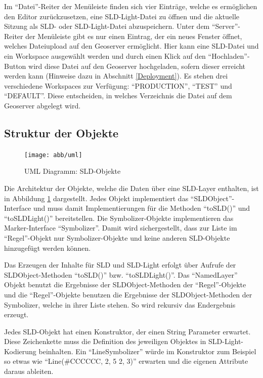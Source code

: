 Im \enquote{Datei}-Reiter der Menüleiste finden sich vier Einträge, welche es ermöglichen den Editor zurückzusetzen, eine SLD-Light-Datei zu öffnen und die aktuelle Sitzung als SLD- oder SLD-Light-Datei abzuspeichern. Unter dem \enquote{Server}-Reiter der Menüleiste gibt es nur einen Eintrag, der ein neues Fenster öffnet, welches Dateiupload auf den Geoserver ermöglicht. Hier kann eine SLD-Datei und ein Workspace ausgewählt werden und durch einen Klick auf den \enquote{Hochladen}-Button wird diese Datei auf den Geoserver hochgeladen, sofern dieser erreicht werden kann (Hinweise dazu in Abschnitt \ref{Deployment}). Es stehen drei verschiedene Workspaces zur Verfügung: \enquote{PRODUCTION}, \enquote{TEST} und \enquote{DEFAULT}. Diese entscheiden, in welches Verzeichnis die Datei auf dem Geoserver abgelegt wird.


\subsection{Struktur der Objekte}

\begin{figure}[h]
 \centering
 \texttt{[image: abb/uml]}
 \caption{UML Diagramm: SLD-Objekte}\label{abb:uml}
\end{figure}

Die Architektur der Objekte, welche die Daten über eine SLD-Layer enthalten, ist in Abbildung \ref{abb:uml} dargestellt. Jedes Objekt implementiert das \enquote{SLDObject}-Interface und muss damit Implementierungen für die Methoden \enquote{toSLD()} und \enquote{toSLDLight()} bereitstellen. Die Symbolizer-Objekte implementieren das Marker-Interface \enquote{Symbolizer}. Damit wird sichergestellt, dass zur Liste im \enquote{Regel}-Objekt nur Symbolizer-Objekte und keine anderen SLD-Objekte hinzugefügt werden können. 

Das Erzeugen der Inhalte für SLD und SLD-Light erfolgt über Aufrufe der SLDObject-Methoden \enquote{toSLD()} bzw. \enquote{toSLDLight()}. Das \enquote{NamedLayer} Objekt benutzt die Ergebnisse der SLDObject-Methoden der \enquote{Regel}-Objekte und die \enquote{Regel}-Objekte benutzen die Ergebnisse der SLDObject-Methoden der Symbolizer, welche in ihrer Liste stehen. So wird rekursiv das Endergebnis erzeugt. 

Jedes SLD-Objekt hat einen Konstruktor, der einen String Parameter erwartet. Diese Zeichenkette muss die Definition des jeweiligen Objektes in SLD-Light-Kodierung beinhalten. Ein \enquote{LineSymbolizer} würde im Konstruktor zum Beispiel so etwas wie \enquote{Line(\#CCCCCC, 2, 5 2, 3)} erwarten und die eigenen Attribute daraus ableiten. 


